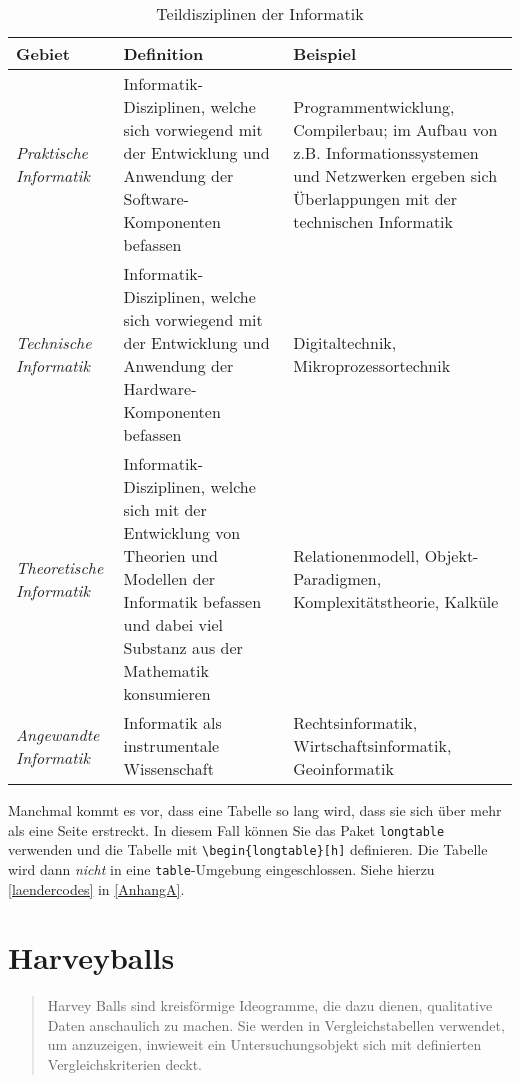 \begin{table}[h]
  \caption{Teildisziplinen der Informatik}
  \label{Kap2:Teildisziplinen}
  \renewcommand{\arraystretch}{1.2}
  \centering
  \sffamily
  \begin{footnotesize}
    \begin{tabularx}{0.9\textwidth}{l X L}
      \toprule
      \textbf{Gebiet} & \textbf{Definition} & \textbf{Beispiel}\\
      \midrule
      \emph{Praktische Informatik} & Informatik-Disziplinen, welche sich vorwiegend mit der Entwicklung und Anwendung der Software-Komponenten befassen & Programmentwicklung, Compilerbau; im Aufbau von z.B. Informationssystemen und Netzwerken ergeben sich Überlappungen mit der technischen Informatik \\
      \emph{Technische Informatik} & Informatik-Disziplinen, welche sich vorwiegend mit der Entwicklung und Anwendung der Hardware-Komponenten befassen & Digitaltechnik, Mikroprozessortechnik \\
      \emph{Theoretische Informatik} & Informatik-Disziplinen, welche sich mit der Entwicklung von Theorien und Modellen der Informatik befassen und dabei viel Substanz aus der Mathematik konsumieren & Relationenmodell, Objekt-Paradigmen, Komplexitätstheorie, Kalküle \\
      \emph{Angewandte Informatik} & Informatik als instrumentale Wissenschaft & Rechtsinformatik, Wirtschaftsinformatik, Geoinformatik \\
      \bottomrule
    \end{tabularx}
  \end{footnotesize}
  \rmfamily
\end{table}

Manchmal kommt es vor, dass eine Tabelle so lang wird, dass sie sich über mehr als eine Seite erstreckt. In diesem Fall können Sie das Paket \texttt{longtable} verwenden und die Tabelle mit \verb+\begin{longtable}[h]+ definieren. Die Tabelle wird dann \textit{nicht} in eine \texttt{table}-Umgebung eingeschlossen. Siehe hierzu \autoref{laendercodes} in \autoref{AnhangA}.


\section{Harveyballs}

\begin{quote}
    Harvey Balls sind kreisförmige Ideogramme, die dazu dienen, qualitative Daten anschaulich zu machen. Sie werden in Vergleichstabellen verwendet, um anzuzeigen, inwieweit ein Untersuchungsobjekt sich mit definierten Vergleichskriterien deckt. \parencite{Wikipedia_HarveyBalls}
\end{quote}

